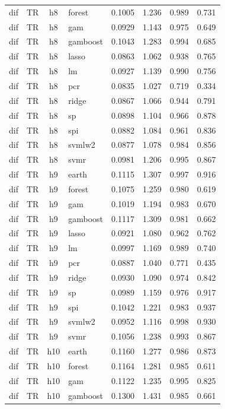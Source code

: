 \begin{ThreePartTable}
\begin{longtable}[t]{llclcccc}
dif & TR & h8 & forest & 0.1005 & 1.236 & 0.989 & 0.731\\
dif & TR & h8 & gam & 0.0929 & 1.143 & 0.975 & 0.649\\
dif & TR & h8 & gamboost & 0.1043 & 1.283 & 0.994 & 0.685\\
dif & TR & h8 & lasso & 0.0863 & 1.062 & 0.938 & 0.765\\
dif & TR & h8 & lm & 0.0927 & 1.139 & 0.990 & 0.756\\
dif & TR & h8 & pcr & 0.0835 & 1.027 & 0.719 & 0.334\\
dif & TR & h8 & ridge & 0.0867 & 1.066 & 0.944 & 0.791\\
dif & TR & h8 & sp & 0.0898 & 1.104 & 0.966 & 0.878\\
dif & TR & h8 & spi & 0.0882 & 1.084 & 0.961 & 0.836\\
dif & TR & h8 & svmlw2 & 0.0877 & 1.078 & 0.984 & 0.856\\
dif & TR & h8 & svmr & 0.0981 & 1.206 & 0.995 & 0.867\\
\addlinespace
dif & TR & h9 & earth & 0.1115 & 1.307 & 0.997 & 0.916\\
dif & TR & h9 & forest & 0.1075 & 1.259 & 0.980 & 0.619\\
dif & TR & h9 & gam & 0.1019 & 1.194 & 0.983 & 0.670\\
dif & TR & h9 & gamboost & 0.1117 & 1.309 & 0.981 & 0.662\\
dif & TR & h9 & lasso & 0.0921 & 1.080 & 0.962 & 0.762\\
dif & TR & h9 & lm & 0.0997 & 1.169 & 0.989 & 0.740\\
dif & TR & h9 & pcr & 0.0887 & 1.040 & 0.771 & 0.435\\
dif & TR & h9 & ridge & 0.0930 & 1.090 & 0.974 & 0.842\\
dif & TR & h9 & sp & 0.0989 & 1.159 & 0.976 & 0.917\\
dif & TR & h9 & spi & 0.1042 & 1.221 & 0.983 & 0.937\\
dif & TR & h9 & svmlw2 & 0.0952 & 1.116 & 0.998 & 0.930\\
dif & TR & h9 & svmr & 0.1056 & 1.238 & 0.993 & 0.867\\
\addlinespace
dif & TR & h10 & earth & 0.1160 & 1.277 & 0.986 & 0.873\\
dif & TR & h10 & forest & 0.1164 & 1.281 & 0.985 & 0.611\\
dif & TR & h10 & gam & 0.1122 & 1.235 & 0.995 & 0.825\\
dif & TR & h10 & gamboost & 0.1300 & 1.431 & 0.985 & 0.661\\

\end{longtable}
\end{ThreePartTable}
